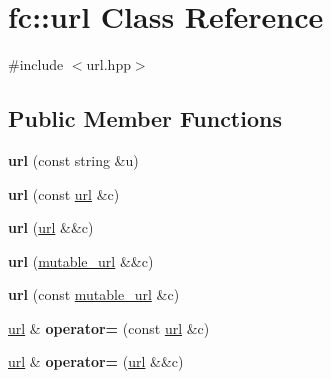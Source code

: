 \hypertarget{classfc_1_1url}{}\section{fc\+:\+:url Class Reference}
\label{classfc_1_1url}


{\ttfamily \#include $<$url.\+hpp$>$}

\subsection*{Public Member Functions}
\begin{DoxyCompactItemize}
\item 
\mbox{\label{classfc_1_1url_af12948fe0aaa05d76dea827012fcbd90}} 
{\bfseries url} (const string \&u)
\item 
\mbox{\label{classfc_1_1url_a8f8f39a1aba8378fa7ae546bf36f9576}} 
{\bfseries url} (const \mbox{\hyperlink{classfc_1_1url}{url}} \&c)
\item 
\mbox{\label{classfc_1_1url_aea2a56853fd24a7d6ba990e3ae92ba44}} 
{\bfseries url} (\mbox{\hyperlink{classfc_1_1url}{url}} \&\&c)
\item 
\mbox{\label{classfc_1_1url_abd98cf11c0993aad2563314dc89433b9}} 
{\bfseries url} (\mbox{\hyperlink{classfc_1_1mutable__url}{mutable\+\_\+url}} \&\&c)
\item 
\mbox{\label{classfc_1_1url_af23145370c0f907a4c2fedfaf84780dc}} 
{\bfseries url} (const \mbox{\hyperlink{classfc_1_1mutable__url}{mutable\+\_\+url}} \&c)
\item 
\mbox{\label{classfc_1_1url_ab13e459f6c60df51ca0af09f6194c6f2}} 
\mbox{\hyperlink{classfc_1_1url}{url}} \& {\bfseries operator=} (const \mbox{\hyperlink{classfc_1_1url}{url}} \&c)
\item 
\mbox{\label{classfc_1_1url_a01d044f81a0b8630cad9658f1ff75fc5}} 
\mbox{\hyperlink{classfc_1_1url}{url}} \& {\bfseries operator=} (\mbox{\hyperlink{classfc_1_1url}{url}} \&\&c)
\item 
\mbox{\label{classfc_1_1url_a45aa1636f02172bfc079e2adbc14bc69}} 

\end{DoxyCompactItemize}
